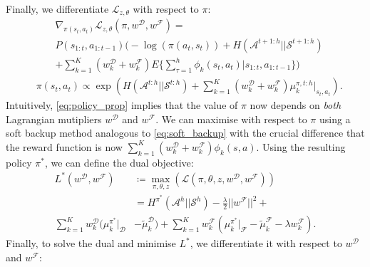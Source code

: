 \documentclass[letterpaper]{article}
\newcommand{\sw}[1]{\textcolor{red}{SW: #1}}
\newcommand{\ks}[1]{\textcolor{green}{Kyriacos: #1}}
\newcommand{\sw}[1]{}
\newcommand{\ks}[1]{}
\begin{document}
Finally, we differentiate $\mathcal{L}_{z,\theta}$ with respect to $\pi$:
\begin{equation}
 \begin{split}
 &\nabla_{\pi(s_t,a_t)}\mathcal{L}_{z,\theta}(\pi,w^{\mathcal{D}},w^{\mathcal{F}}) =\\
&P(s_{1:t},a_{1:t-1})\big(-\log(\pi(a_t,s_t))+ H(\mathcal{A}^{t+1:h}||\mathcal{S}^{t+1:h})\\
& +\sum\nolimits_{k=1}^K (w^{\mathcal{D}}_k+ w^{\mathcal{F}}_k)E\big\{\sum\nolimits_{\tau=1}^h \phi_k(s_t,a_t)|s_{1:t},a_{1:t-1}\big\}\big) \label{eqn:lagragian_derivative_failure}
 \end{split}
\end{equation}
\begin{equation}
\label{eq:policy_prop}
	\begin{split}
	&\pi(s_t,a_t) \propto \exp\left(H(\mathcal{A}^{t:h}||\mathcal{S}^{t:h})+\sum^K_{k=1}(w^{\mathcal{D}}_k + w^{\mathcal{F}}_k)\mu_k^{\pi,t:h}|_{s_t,a_t}\right).
	\end{split}
\end{equation}
Intuitively, \eqref{eq:policy_prop} implies that the value of $\pi$ now depends on \emph{both} Lagrangian mutipliers $w^{\mathcal{D}}$ and $w^{\mathcal{F}}$.  We can maximise with respect to $\pi$ using a soft backup method analogous to \eqref{eq:soft_backup} with the crucial difference that the reward function is now $\sum_{k=1}^K(w^{\mathcal{D}}_k + w^{\mathcal{F}}_k)\phi_k(s,a)$.  Using the resulting policy $\pi^*$, we can define the dual objective:
\begin{equation}
	\begin{split}
	L^*(w^{\mathcal{D}},w^{\mathcal{F}}) &\coloneqq\max_{\pi,\theta,z}\left(\mathcal{L}(\pi,\theta,z,w^{\mathcal{D}},w^{\mathcal{F}})\right)\\
				  &= H^{\pi^*}(\mathcal{A}^h||\mathcal{S}^h) - \frac{\lambda}{2}||w^{\mathcal{F}}||^2 +\\ 
				\sum_{k=1}^Kw^{\mathcal{D}}_k(\mu^{\pi^*}_k|_{\mathcal{D}}&-\widetilde{\mu}^{\mathcal{D}}_k) +
				\sum_{k=1}^Kw^{\mathcal{F}}_k (\mu^{\pi^*}_k|_{\mathcal{F}} -\widetilde{\mu}^{\mathcal{F}}_k-\lambda w^{\mathcal{F}}_k).
	\end{split}
	\label{eq:partial_objective_failure}
\end{equation}
Finally, to solve the dual and minimise $L^*$, we differentiate it with respect to $w^{\mathcal{D}}$ and $w^{\mathcal{F}}$:
\end{document}
